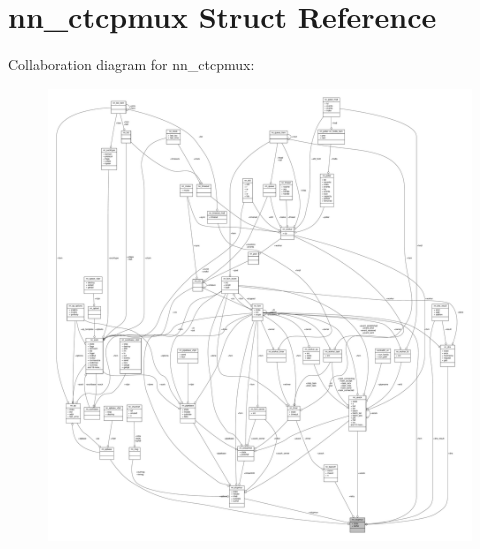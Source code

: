 \hypertarget{structnn__ctcpmux}{}\section{nn\+\_\+ctcpmux Struct Reference}
\label{structnn__ctcpmux}


Collaboration diagram for nn\+\_\+ctcpmux\+:\nopagebreak
\begin{figure}[H]
\begin{center}
\leavevmode
\includegraphics[width=350pt]{structnn__ctcpmux__coll__graph}
\end{center}
\end{figure}

